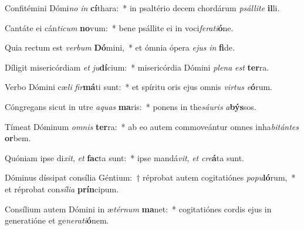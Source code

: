 \item Confitémini Dómi\textit{no} \textit{in} \textbf{cí}thara:~* in psaltério decem chordárum \textit{psál}\textit{li}\textit{te} \textbf{il}li.
\item Cantáte ei cán\textit{ti}\textit{cum} \textbf{no}vum:~* bene psállite ei in voci\textit{fe}\textit{ra}\textit{ti}\textbf{ó}ne.
\item Quia rectum est \textit{ver}\textit{bum} \textbf{Dó}mini,~* et ómnia ópera \textit{e}\textit{jus} \textit{in} \textbf{fi}de.
\item Díligit misericórdiam \textit{et} \textit{ju}\textbf{dí}cium:~* misericórdia Dómini \textit{ple}\textit{na} \textit{est} \textbf{ter}ra.
\item Verbo Dómini cæ\textit{li} \textit{fir}\textbf{má}ti sunt:~* et spíritu oris ejus omnis \textit{vir}\textit{tus} \textit{e}\textbf{ó}rum.
\item Cóngregans sicut in utre \textit{a}\textit{quas} \textbf{ma}ris:~* ponens in the\textit{sáu}\textit{ris} \textit{a}\textbf{býs}sos.
\item Tímeat Dóminum \textit{om}\textit{nis} \textbf{ter}ra:~* ab eo autem commoveántur omnes inha\textit{bi}\textit{tán}\textit{tes} \textbf{or}bem.
\item Quóniam ipse di\textit{xit}, \textit{et} \textbf{fac}ta sunt:~* ipse mandá\textit{vit}, \textit{et} \textit{cre}\textbf{á}ta sunt.
\item Dóminus díssipat consília Géntium:~† réprobat autem cogitatiónes \textit{po}\textit{pu}\textbf{ló}rum,~* et réprobat con\textit{sí}\textit{li}\textit{a} \textbf{prín}cipum.
\item Consílium autem Dómini in æ\textit{tér}\textit{num} \textbf{ma}net:~* cogitatiónes cordis ejus in generatióne et ge\textit{ne}\textit{ra}\textit{ti}\textbf{ó}nem.
